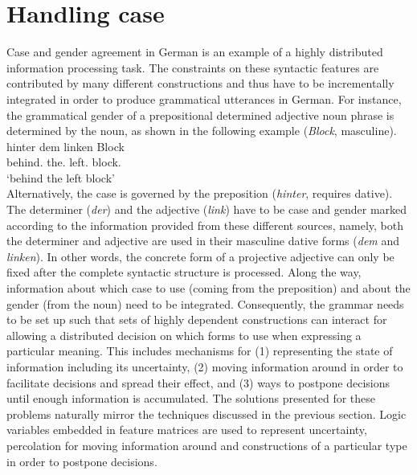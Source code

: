 \section{Handling case}
\label{s:handling-case}
Case and gender agreement in German is an example of a 
highly distributed information
processing task. The constraints on these syntactic features 
are contributed by many different constructions 
and thus have to be incrementally integrated in order
to produce grammatical utterances in German. For instance, the
grammatical gender of a prepositional determined adjective noun phrase
is determined by the noun, as shown in the following example (\textit{Block}, masculine).
\ea
\label{e:hinter-dem-linken-block}
\gll hinter dem linken Block\\
behind.{\PREP} the.{\DAT} left.{\DAT} block.{\DAT}\\
\glt `behind the left block'\\
\z 
Alternatively, the case is governed by the preposition (\textit{hinter}, requires dative). The determiner (\textit{der}) and the
adjective (\textit{link}) have to be case and gender marked according to
the information provided from these different sources,
namely, both the determiner and adjective are used in
their masculine dative forms (\textit{dem} and \textit{linken}). In other words,
the concrete form of a projective adjective can only be fixed after
the complete syntactic structure is processed. Along the way, 
information about which
case to use (coming from the preposition) and about the gender (from the noun) need to be integrated. 
Consequently, the grammar needs to be set up such that sets of 
highly dependent constructions can interact for allowing a distributed  
decision on which forms to use when expressing a particular
meaning. This includes mechanisms for (1) representing the
state of information including its uncertainty, (2) moving information
around in order to facilitate decisions and spread their effect, and
(3) ways to postpone decisions until enough information is
accumulated. The solutions presented for these problems naturally
mirror the techniques discussed in the previous section. Logic
variables embedded in feature matrices are used to represent
uncertainty, percolation for moving information around and
constructions of a particular type in order to postpone decisions.


